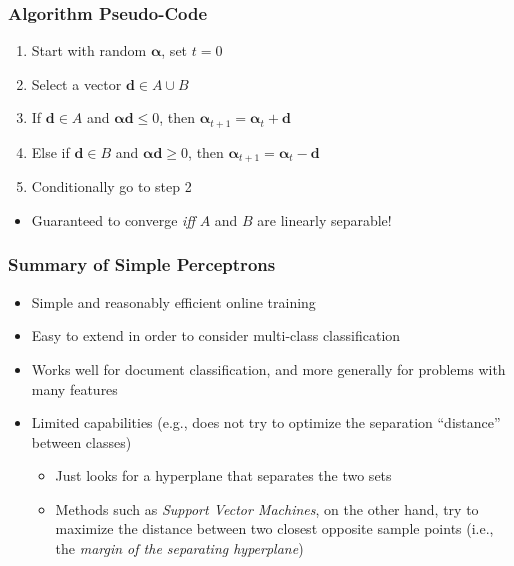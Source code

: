 \documentclass{beamer}
\begin{document}
\begin{frame} \frametitle{Algorithm Pseudo-Code}
    \begin{enumerate}
    \item Start with random $\mathbf \alpha$, set $t = 0$
    \item Select a vector $\mathbf d \in A \cup B$
    \item If $\mathbf d \in A$ and $\mathbf \alpha \mathbf d \leq 0$, then $\mathbf \alpha_{t+1} = \mathbf \alpha_t + \mathbf d$
    \item Else if $\mathbf d \in B$ and $\mathbf \alpha \mathbf d \geq 0$, then $\mathbf \alpha_{t+1} = \mathbf \alpha_t - \mathbf d$    
    \item Conditionally go to step 2
    \end{enumerate}
    \begin{itemize}
    \item Guaranteed to converge \emph{iff} $A$ and $B$ are linearly separable!
    \end{itemize}
\end{frame}

\begin{frame} \frametitle{Summary of Simple Perceptrons}
  \begin{itemize}
  \item Simple and reasonably efficient online training
  \item Easy to extend in order to consider multi-class classification
  \item Works well for  document classification, and more generally for problems with many features
  \item Limited capabilities (e.g., does not try to optimize the separation ``distance'' between classes)
  \begin{itemize}
  \item Just looks for a hyperplane that separates the two sets 
  \item Methods such as \emph{Support Vector Machines}, on the other hand, try to maximize the distance between two closest opposite sample points (i.e., the \emph{margin of the separating hyperplane})
  \end{itemize}  
  \end{itemize}
\end{frame}


\end{document}
